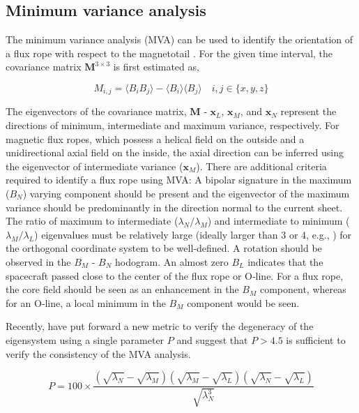 \subsection{Minimum variance analysis}
The minimum variance analysis (MVA) can be used to identify the orientation of a flux rope with respect to the magnetotail \cite{Sonnerup1967MagnetopauseObservations}. For the given time interval, the covariance matrix $\mathbf{M}^{3\times3}$ is first estimated as,

\begin{equation}
    M_{i,j} = \langle B_i B_j \rangle - \langle B_i\rangle \langle B_j\rangle \quad  i,j \in \{x, y, z\}
\end{equation}

The eigenvectors of the covariance matrix, $\mathbf{M}$ ‐ $\mathbf{x}_L$, $\mathbf{x}_M$, and $\mathbf{x}_N$ represent the directions of minimum, intermediate and maximum variance, respectively. For magnetic flux ropes, which possess a helical field on the outside and a unidirectional axial field on the inside, the axial direction can be inferred using the eigenvector of intermediate variance ($\mathbf{x}_M$). There are additional criteria required to identify a flux rope using MVA: A bipolar signature in the maximum ($B_N$) varying component should be present and the eigenvector of the maximum variance should be predominantly in the direction normal to the current sheet. The ratio of maximum to intermediate ($\lambda_N / \lambda_M$) and intermediate to minimum ($\lambda_M / \lambda_L$) eigenvalues must be relatively large (ideally larger than 3 or 4, e.g., ) for the orthogonal coordinate system to be well‐defined. A rotation should be observed in the $B_M$ - $B_N$ hodogram. An almost zero $B_L$ indicates that the spacecraft passed close to the center of the flux rope or O‐line. For a flux rope, the core field should be seen as an enhancement in the $B_M$ component, whereas for an O‐line, a local minimum in the $B_M$ component would be seen. 

Recently,  have put forward a new metric to verify the degeneracy of the eigensystem using a single parameter $P$ and suggest that $P > 4.5$ is sufficient to verify the consistency of the MVA analysis.

\begin{equation}
    P = 100 \times \frac{\left(\sqrt{\lambda_N} - \sqrt{\lambda_M} \right) \left(\sqrt{\lambda_M} - \sqrt{\lambda_L} \right) \left(\sqrt{\lambda_N} - \sqrt{\lambda_L} \right) }{\sqrt{\lambda_N^3}}
    \label{eqn:mva-p}
\end{equation}

